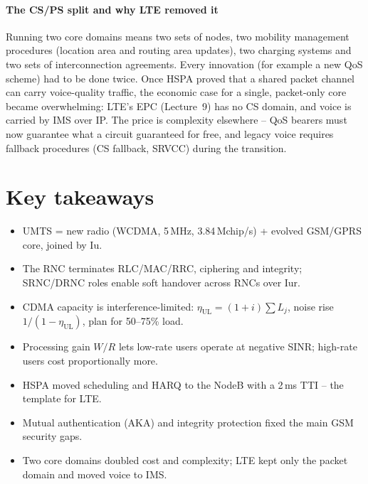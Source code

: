 \documentclass[11pt,a4paper]{article}
\begin{document}
\paragraph{The CS/PS split and why LTE removed it} Running two core domains means two sets of
nodes, two mobility management procedures (location area and routing area updates), two
charging systems and two sets of interconnection agreements. Every innovation (for example a
new QoS scheme) had to be done twice. Once HSPA proved that a shared packet channel can carry
voice-quality traffic, the economic case for a single, packet-only core became overwhelming:
LTE's EPC (Lecture~9) has no CS domain, and voice is carried by IMS over IP. The price is
complexity elsewhere -- QoS bearers must now guarantee what a circuit guaranteed for free, and
legacy voice requires fallback procedures (CS fallback, SRVCC) during the transition.

\section{Key takeaways}
\begin{takeawaybox}
\begin{itemize}
  \item UMTS = new radio (WCDMA, 5\,MHz, 3.84\,Mchip/s) + evolved GSM/GPRS core, joined by Iu.
  \item The RNC terminates RLC/MAC/RRC, ciphering and integrity; SRNC/DRNC roles enable soft
        handover across RNCs over Iur.
  \item CDMA capacity is interference-limited: $\eta_{\mathrm{UL}} = (1+i)\sum L_j$, noise rise
        $1/(1-\eta_{\mathrm{UL}})$, plan for 50--75\% load.
  \item Processing gain $W/R$ lets low-rate users operate at negative SINR; high-rate users cost
        proportionally more.
  \item HSPA moved scheduling and HARQ to the NodeB with a 2\,ms TTI -- the template for LTE.
  \item Mutual authentication (AKA) and integrity protection fixed the main GSM security gaps.
  \item Two core domains doubled cost and complexity; LTE kept only the packet domain and moved
        voice to IMS.
\end{itemize}
\end{takeawaybox}

\end{document}
